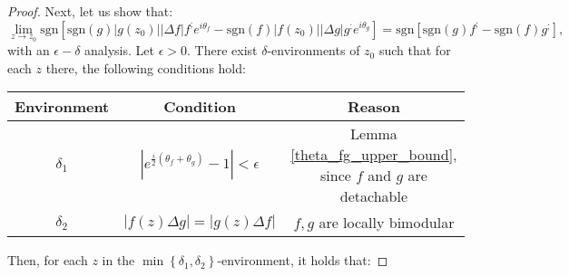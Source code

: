 \documentclass[11pt]{book}
\begin{document}
\begin{proof}
Next, let us show that:
$$\underset{z\to z_{0}}{\lim}\text{sgn}\left[\text{sgn}\left(g\right)\left|g\left(z_{0}\right)\right|\left|\Delta f\right|f^{;}e^{i\theta_{f}}-\text{sgn}\left(f\right)\left|f\left(z_{0}\right)\right|\left|\Delta g\right|g^{;}e^{i\theta_{g}}\right]=\text{sgn}\left[\text{sgn}\left(g\right)f^{;}-\text{sgn}\left(f\right)g^{;}\right],$$
with an $\epsilon-\delta$ analysis. Let $\epsilon>0.$ There exist $\delta$-environments of $z_{0}$ such that for each $z$ there, the following conditions hold:

\begin{table}[H]
\centering
        \begin{tabular}{ccc}
        \toprule
        \textbf{Environment} & \textbf{Condition} & \textbf{Reason} \\
        \midrule
        $\delta_1$ & $\left|e^{\frac{i}{2}\left(\theta_{f}+\theta_{g}\right)}-1\right|<\epsilon$ & Lemma \ref{theta_fg_upper_bound}, since $f$ and $g$ are detachable \\
        $\delta_2$ & $\left|f\left(z\right)\Delta g\right|=\left|g\left(z\right)\Delta f\right|$ & $f,g$ are locally bimodular \\
        \bottomrule
        \end{tabular}
\end{table}

Then, for each $z$ in the $\min\left\{ \delta_{1},\delta_{2}\right\}$-environment, it holds that:


\end{proof}
\end{document}
